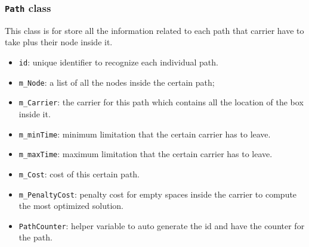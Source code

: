 \documentclass[oneside,titlepage,12pt]{memoir}
\begin{document}
\subsubsection{\texttt{Path} class}\label{path-class}

This class is for store all the information related to each path that
carrier have to take plus their node inside it.

\begin{itemize}
\itemsep1pt\parskip0pt
\item
  \texttt{id}: unique identifier to recognize each individual path.
\item
  \texttt{m\_Node}: a list of all the nodes inside the certain path;
\item
  \texttt{m\_Carrier}: the carrier for this path which contains all the
  location of the box inside it.
\item
  \texttt{m\_minTime}: minimum limitation that the certain carrier has
  to leave.
\item
  \texttt{m\_maxTime}: maximum limitation that the certain carrier has
  to leave.
\item
  \texttt{m\_Cost}: cost of this certain path.
\item
  \texttt{m\_PenaltyCost}: penalty cost for empty spaces inside the
  carrier to compute the most optimized solution.
\item
  \texttt{PathCounter}: helper variable to auto generate the id and have
  the counter for the path.
\end{itemize}
\end{document}
